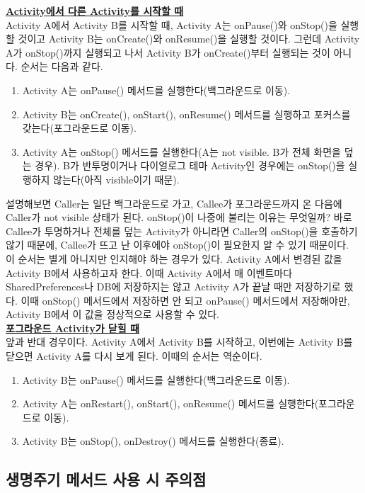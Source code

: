 \underline{\bfseries Activity에서 다른 Activity를 시작할 때}\\
Activity A에서 Activity B를 시작할 때, Activity A는 onPause()와 onStop()을 실행할 것이고
Activity B는 onCreate()와 onResume()을 실행할 것이다.
그런데 Activity A가 onStop()까지 실행되고 나서 Activity B가 onCreate()부터 실행되는 것이 아니다.
순서는 다음과 같다.
\begin{enumerate}
\item Activity A는 onPause() 메서드를 실행한다(백그라운드로 이동).
\item Activity B는 onCreate(), onStart(), onResume() 메서드를 실행하고 포커스를 갖는다(포그라운드로 이동).
\item Activity A는 onStop() 메서드를 실행한다(A는 not visible. B가 전체 화면을 덮는 경우). B가 반투명이거나 다이얼로그 테마 Activity인 경우에는 onStop()을 실행하지 않는다(아직 visible이기 때문).
\end{enumerate}

설명해보면 Caller는 일단 백그라운드로 가고, Callee가 포그라운드까지 온 다음에 Caller가 not visible 상태가 된다.
onStop()이 나중에 불리는 이유는 무엇일까? 
바로 Callee가 투명하거나 전체를 덮는 Activity가 아니라면 Caller의 onStop()을 호출하기 않기 때문에, 
Callee가 뜨고 난 이후에야 onStop()이 필요한지 알 수 있기 때문이다.\\

이 순서는 별게 아니지만 인지해야 하는 경우가 있다. 
Activity A에서 변경된 값을 Activity B에서 사용하고자 한다.
이때 Activity A에서 매 이벤트마다 
SharedPreferences나 DB에 저장하지는 않고 Activity A가 끝날 때만 저장하기로 했다.
이때 onStop() 메서드에서 저장하면 안 되고 onPause() 메서드에서 저장해야만, Activity B에서 이 값을 정상적으로 사용할 수 있다.\\

\underline{\bfseries 포그라운드 Activity가 닫힐 때}\\
앞과 반대 경우이다. 
Activity A에서 Activity B를 시작하고, 이번에는 Activity B를 닫으면 Activity A를 다시 보게 된다.
이때의 순서는 역순이다.
\begin{enumerate}
\item Activity B는 onPause() 메서드를 실행한다(백그라운드로 이동).
\item Activity A는 onRestart(), onStart(), onResume() 메서드를 실행한다(포그라운드로 이동).
\item Activity B는 onStop(), onDestroy() 메서드를 실행한다(종료).
\end{enumerate}


\subsection{생명주기 메서드 사용 시 주의점}
